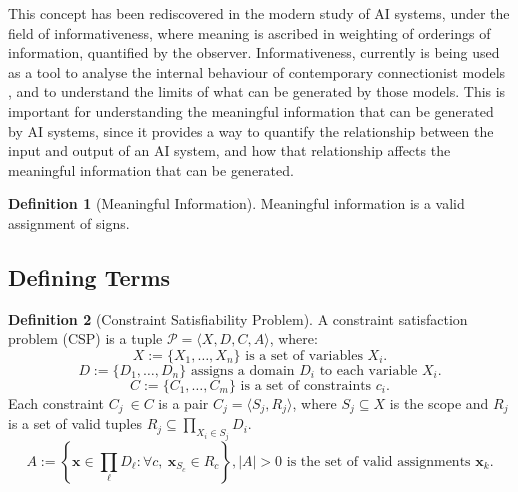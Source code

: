 \documentclass[stu,12pt]{apa7}
\theoremstyle{definition}
\newtheorem{definition}{Definition}[section]
\begin{document}
This concept has been rediscovered in the modern study of AI systems, under the field of informativeness, where meaning is ascribed in weighting of orderings of information, quantified by the observer. Informativeness, currently is being used as a tool to analyse the internal behaviour of contemporary connectionist models \parencite{brockmeier2017quantifying}, and to understand the limits of what can be generated by those models. This is important for understanding the meaningful information that can be generated by AI systems, since it provides a way to quantify the relationship between the input and output of an AI system, and how that relationship affects the meaningful information that can be generated.

\begin{definition}[Meaningful Information]\label{def:meaningful}
    Meaningful information is a valid assignment of signs.
\end{definition}

\subsection{Defining Terms}\label{terms}

\begin{definition}[Constraint Satisfiability Problem]\label{def:csp}
    A constraint satisfaction problem (CSP) is a tuple $\mathcal{P} = \langle X, D, C, A \rangle$, where:
    \begin{equation}
        X:=\{X_1, \ldots, X_n\}
        \text{ is a set of variables } X_i.
    \end{equation}
    \begin{equation}
    D:=\{D_1, \ldots, D_n\} \text{ assigns a domain } D_i \text{ to each variable } X_i.
    \end{equation}
    \begin{equation}
    C:=\{C_1,\ldots,C_m\} \text{ is a set of constraints } c_i.
    \end{equation}
     Each constraint $C_j\ \in C$ is a pair $C_j=\langle S_j,R_j\rangle$, where $S_j \subseteq X$ is the scope and $R_j$ is a set of valid tuples $R_j \subseteq \underset{X_i \in S_j}{\prod}D_i.$
    \begin{equation}
        A:=\left\{\mathbf{x}\in \underset{\ell}{\prod} D_\ell:\forall c,\ \mathbf{x}_{S_c}\in R_c\right\}, |A|>0 \text{ is the set of valid assignments $\mathbf{x}_k$.}
    \end{equation}
    
\end{definition}
\end{document}
